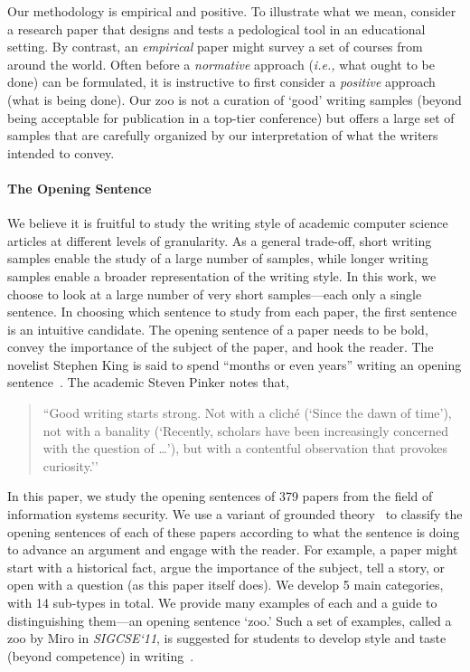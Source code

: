 \documentclass[sigconf]{acmart}
\newcommand{\ie}{\textit{i.e.,}\xspace}
\begin{document}
Our methodology is empirical and positive. To illustrate what we mean, consider a research paper that designs and tests a pedological tool in an educational setting. By contrast, an \textit{empirical} paper might survey a set of courses from around the world. Often before a \textit{normative} approach (\ie what ought to be done) can be formulated, it is instructive to first consider a \textit{positive} approach (what is being done). Our zoo is not a curation of `good' writing samples (beyond being acceptable for publication in a top-tier conference) but offers a large set of samples that are carefully organized by our interpretation of what the writers intended to convey.

\paragraph{The Opening Sentence}

We believe it is fruitful to study the writing style of academic computer science articles at different levels of granularity. As a general trade-off, short writing samples enable the study of a large number of samples, while longer writing samples enable a broader representation of the writing style. In this work, we choose to look at a large number of very short samples---each only a single sentence. In choosing which sentence to study from each paper, the first sentence is an intuitive candidate. The opening sentence of a paper needs to be bold, convey the importance of the subject of the paper, and hook the reader. The novelist Stephen King is said to spend ``months or even years'' writing an opening sentence~\cite{Fas13}. The academic Steven Pinker notes that,

\begin{quote}
``Good writing starts strong. Not with a cliché (`Since the dawn of time’), not with a banality (`Recently, scholars have been increasingly concerned with the question of …’), but with a contentful observation that provokes curiosity.''~\cite{Pin15}
\end{quote}

In this paper, we study the opening sentences of 379 papers from the field of information systems security. We use a variant of grounded theory~\cite{glaser1968discovery} to classify the opening sentences of each of these papers according to what the sentence is doing to advance an argument and engage with the reader. For example, a paper might start with a historical fact, argue the importance of the subject, tell a story, or open with a question (as this paper itself does). We develop 5 main categories, with 14 sub-types in total. We provide many examples of each and a guide to distinguishing them---an opening sentence `zoo.' Such a set of examples, called a zoo by Miro in \textit{SIGCSE`11}, is suggested for students to develop style and taste (beyond competence) in writing~\cite{Mir11}.
\end{document}
